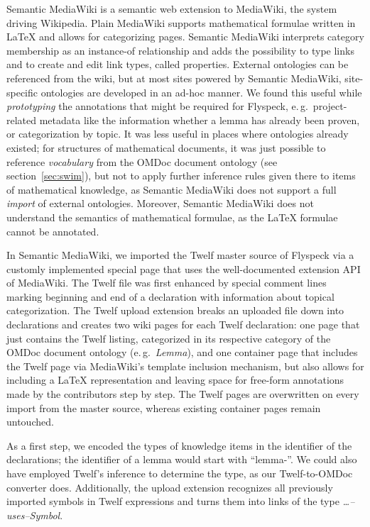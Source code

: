 Semantic MediaWiki\cite{KrSchVr:semwiki-reasoning07} is a semantic web extension
to MediaWiki, the system driving Wikipedia.  Plain MediaWiki supports
mathematical formulae written in {\LaTeX} and allows for categorizing pages.
Semantic MediaWiki interprets category membership as an instance-of relationship
and adds the possibility to type links and to create and edit link types, called
properties.  External ontologies can be referenced from the wiki, but at most
sites powered by Semantic MediaWiki, site-specific ontologies are developed in
an ad-hoc manner.  We found this useful while \emph{prototyping} the annotations
that might be required for Flyspeck, e.\,g.\ project-related metadata like the
information whether a lemma has already been proven, or categorization by topic.
It was less useful in places where ontologies already existed; for structures of
mathematical documents, it was just possible to reference \emph{vocabulary} from
the OMDoc document ontology (see section~\ref{sec:swim}), but not to apply
further inference rules given there to items of mathematical knowledge, as
Semantic MediaWiki does not support a full \emph{import} of external ontologies.
Moreover, Semantic MediaWiki does not understand the semantics of mathematical
formulae, as the {\LaTeX} formulae cannot be annotated.

In Semantic MediaWiki, we imported the Twelf master source of Flyspeck via a
customly implemented special page that uses the well-documented extension API of
MediaWiki.  The Twelf file was first enhanced by special comment lines marking
beginning and end of a declaration with information about topical categorization.
The Twelf upload extension breaks an uploaded file down into declarations and
creates two wiki pages for each Twelf declaration: one page that just contains
the Twelf listing, categorized in its respective category of the OMDoc document
ontology (e.\,g.\ \textit{Lemma}), and one container page that includes the
Twelf page via MediaWiki's template inclusion mechanism, but also allows for
including a {\LaTeX} representation and leaving space for free-form annotations
made by the contributors step by step.  The Twelf pages are overwritten on every
import from the master source, whereas existing container pages remain
untouched.

As a first step, we encoded the types of knowledge items in the identifier of
the declarations; the identifier of a lemma would start with ``lemma-''.  We
could also have employed Twelf's inference to determine the
type, as our Twelf-to-OMDoc converter does.  Additionally, the upload
extension recognizes all previously imported symbols in Twelf expressions and
turns them into links of the type \textit{\ldots--uses--Symbol}.

